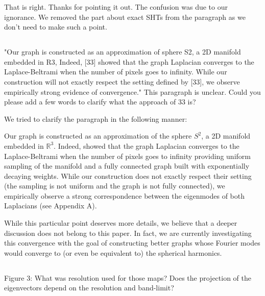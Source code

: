 \documentclass[12pt,a4paper]{article}
\newcommand{\mdeff}[1]{{\color[rgb]{.1,.6,.1}{MD: #1}}}
\newcommand{\1}{\b{1}}              %
\newcommand{\0}{\b{0}}              %
\begin{document}
That is right.
Thanks for pointing it out.
The confusion was due to our ignorance.
We removed the part about exact SHTs from the paragraph as we don't need to make such a point.


\subsection{}
\begin{mdframed}[style=comment]
"Our graph is constructed as an approximation of sphere S2, a 2D manifold embedded in R3, Indeed, [33] showed that the graph Laplacian converges to the Laplace-Beltrami when the number of pixels goes to infinity. While our construction will not exactly respect the setting defined by [33], we observe empirically strong evidence of convergence." This paragraph is unclear. Could you please add a few words to clarify what the approach of 33 is?
\end{mdframed}

We tried to clarify the paragraph in the following manner:
\begin{mdframed}[style=manuscript]
Our graph is constructed as an approximation of the sphere $S^2$, a 2D manifold embedded in $\mathbb{R}^3$.
Indeed, \cite{belkin2007convergence} showed that the graph Laplacian converges to the Laplace-Beltrami when the number of pixels goes to infinity providing uniform sampling of the manifold and a fully connected graph built with exponentially decaying weights.
While our construction does not exactly respect their setting (the sampling is not uniform and the graph is not fully connected), we empirically observe a strong correspondence between the eigenmodes of both Laplacians (see Appendix A).
\end{mdframed}

While this particular point deserves more details, we believe that a deeper discussion does not belong to this paper.
In fact, we are currently investigating this convergence with the goal of constructing better graphs whose Fourier modes would converge to (or even be equivalent to) the spherical harmonics.

\subsection{}

\begin{mdframed}[style=comment]
Figure 3: What was resolution used for those maps? Does the projection of the eigenvectors depend on the resolution and band-limit?
\end{mdframed}
\end{document}
